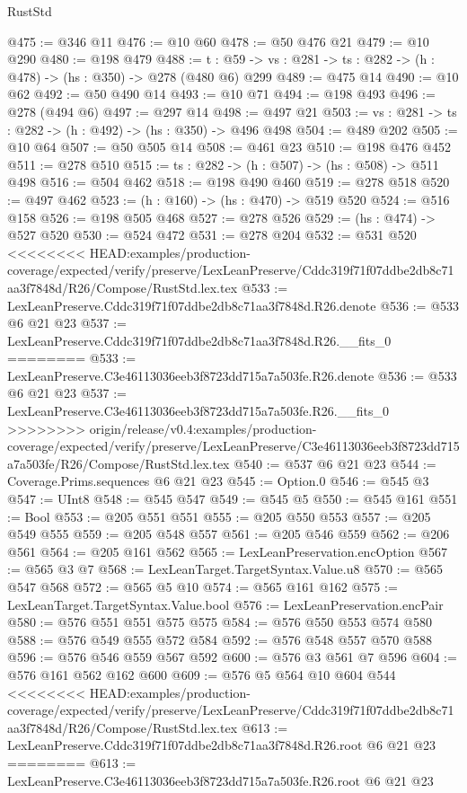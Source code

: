 \begin{lexlean}{RustStd}
\begin{coremodule}
{\begin{coremodule}
@475 := @346 @11
@476 := @10 @60
@478 := @50 @476 @21
@479 := @10 @290
@480 := @198 @479
@488 := {t : @59} -> {vs : @281} -> {ts : @282} -> (h : @478) -> (hs : @350) -> @278 (@480 @6) @299
@489 := @475 @14
@490 := @10 @62
@492 := @50 @490 @14
@493 := @10 @71
@494 := @198 @493
@496 := @278 (@494 @6)
@497 := @297 @14
@498 := @497 @21
@503 := {vs : @281} -> {ts : @282} -> (h : @492) -> (hs : @350) -> @496 @498
@504 := @489 @202
@505 := @10 @64
@507 := @50 @505 @14
@508 := @461 @23
@510 := @198 @476 @452
@511 := @278 @510
@515 := {ts : @282} -> (h : @507) -> (hs : @508) -> @511 @498
@516 := @504 @462
@518 := @198 @490 @460
@519 := @278 @518
@520 := @497 @462
@523 := (h : @160) -> (hs : @470) -> @519 @520
@524 := @516 @158
@526 := @198 @505 @468
@527 := @278 @526
@529 := (hs : @474) -> @527 @520
@530 := @524 @472
@531 := @278 @204
@532 := @531 @520
<<<<<<<< HEAD:examples/production-coverage/expected/verify/preserve/LexLeanPreserve/Cddc319f71f07ddbe2db8c71aa3f7848d/R26/Compose/RustStd.lex.tex
@533 := LexLeanPreserve.Cddc319f71f07ddbe2db8c71aa3f7848d.R26.denote
@536 := @533 @6 @21 @23
@537 := LexLeanPreserve.Cddc319f71f07ddbe2db8c71aa3f7848d.R26.__fits_0
========
@533 := LexLeanPreserve.C3e46113036eeb3f8723dd715a7a503fe.R26.denote
@536 := @533 @6 @21 @23
@537 := LexLeanPreserve.C3e46113036eeb3f8723dd715a7a503fe.R26.__fits_0
>>>>>>>> origin/release/v0.4:examples/production-coverage/expected/verify/preserve/LexLeanPreserve/C3e46113036eeb3f8723dd715a7a503fe/R26/Compose/RustStd.lex.tex
@540 := @537 @6 @21 @23
@544 := Coverage.Prims.sequences @6 @21 @23
@545 := Option.{0}
@546 := @545 @3
@547 := UInt8
@548 := @545 @547
@549 := @545 @5
@550 := @545 @161
@551 := Bool
@553 := @205 @551 @551
@555 := @205 @550 @553
@557 := @205 @549 @555
@559 := @205 @548 @557
@561 := @205 @546 @559
@562 := @206 @561
@564 := @205 @161 @562
@565 := LexLeanPreservation.encOption
@567 := @565 @3 @7
@568 := LexLeanTarget.TargetSyntax.Value.u8
@570 := @565 @547 @568
@572 := @565 @5 @10
@574 := @565 @161 @162
@575 := LexLeanTarget.TargetSyntax.Value.bool
@576 := LexLeanPreservation.encPair
@580 := @576 @551 @551 @575 @575
@584 := @576 @550 @553 @574 @580
@588 := @576 @549 @555 @572 @584
@592 := @576 @548 @557 @570 @588
@596 := @576 @546 @559 @567 @592
@600 := @576 @3 @561 @7 @596
@604 := @576 @161 @562 @162 @600
@609 := @576 @5 @564 @10 @604 @544
<<<<<<<< HEAD:examples/production-coverage/expected/verify/preserve/LexLeanPreserve/Cddc319f71f07ddbe2db8c71aa3f7848d/R26/Compose/RustStd.lex.tex
@613 := LexLeanPreserve.Cddc319f71f07ddbe2db8c71aa3f7848d.R26.root @6 @21 @23
========
@613 := LexLeanPreserve.C3e46113036eeb3f8723dd715a7a503fe.R26.root @6 @21 @23

\end{coremodule}}
\end{coremodule}
\end{lexlean}
